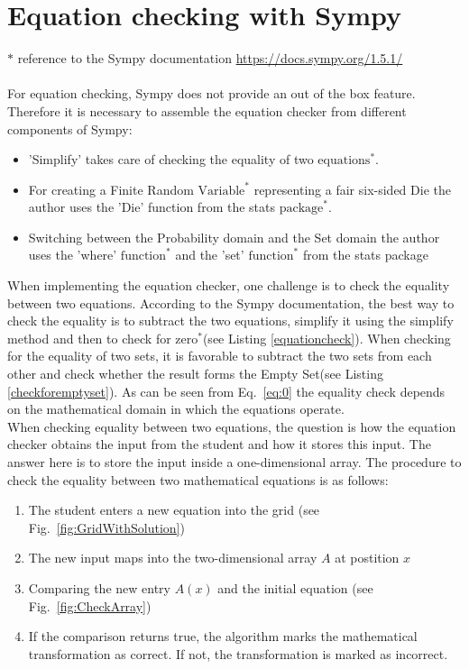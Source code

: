 

    \chapter{Equation checking with Sympy}
        $\ast$ reference to the Sympy documentation \url{https://docs.sympy.org/1.5.1/} \\ \\
        For equation checking, Sympy does not provide an out of the box feature. Therefore it is necessary to assemble the equation checker from different components of Sympy:
        \begin{itemize}
            \item 'Simplify' takes care of checking the equality of two $\text{equations}^{\ast}$.
            \item For creating a Finite Random $\text{Variable}^{\ast}$ representing a fair six-sided Die the author uses the 'Die' function from the stats $\text{package}^{\ast}$.
            \item Switching between the Probability domain and the Set domain the author uses the 'where' $\text{function}^{\ast}$ and the 'set' $\text{function}^{\ast}$ from the stats package
        \end{itemize}
        When implementing the equation checker, one challenge is to check the equality between two equations. According to the Sympy documentation, the best way to check the
        equality is to subtract the two equations, simplify it using the simplify method and then to check for $\text{zero}^{\ast}$(see Listing \ref{equationcheck}).
        When checking for the equality of two sets, it is favorable to subtract the two sets from each other and check whether the result forms the Empty Set(see Listing \ref{checkforemptyset}).
        As can be seen from Eq.~\eqref{eq:0} the equality check depends on the mathematical domain in which the equations operate. \\ When checking equality between two
        equations, the question is how the equation checker obtains the input from the student and how it stores this input. The answer here is to store the input inside a one-dimensional array. The procedure to
        check the equality between two mathematical equations is as follows:
        \begin{enumerate}
            \item The student enters a new equation into the grid (see Fig.~\ref{fig:GridWithSolution})
            \item The new input maps into the two-dimensional array $A$ at postition $x$
            \item Comparing the new entry $A(x)$ and the initial equation (see Fig.~\ref{fig:CheckArray})
            \item If the comparison returns true, the algorithm marks the mathematical transformation as correct. If not, the transformation is marked as incorrect.
        \end{enumerate}
